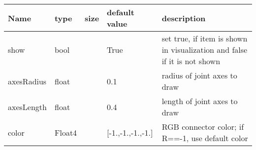 \begin{center}
  \footnotesize
  \begin{longtable}{| p{4.5cm} | p{2.5cm} | p{0.5cm} | p{2.5cm} | p{6cm} |}
    \hline
    \bf Name & \bf type & \bf size & \bf default value & \bf description \\ \hline
    show &     bool &      &     True &     set true, if item is shown in visualization and false if it is not shown\\ \hline
    axesRadius &     float &      &     0.1 &     radius of joint axes to draw\\ \hline
    axesLength &     float &      &     0.4 &     length of joint axes to draw\\ \hline
    color &     Float4 &      &     [-1.,-1.,-1.,-1.] &     RGB connector color; if R==-1, use default color\\ \hline
	  \end{longtable}
	\end{center}

